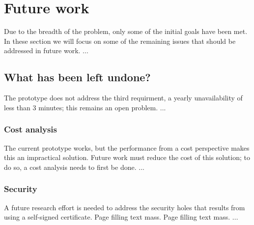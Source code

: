 \section{Future work}
\label{sec:futureWork}










Due to the breadth of the problem, only some of the initial goals have been
met. In these section we will focus on some of the remaining issues that
should be addressed in future work. ...


\subsection{What has been left undone?}
\label{what-has-been-left-undone}


The prototype does not address the third requirment, \ie a yearly unavailability of less than 3 minutes; this remains an open problem. ...


\subsubsection{Cost analysis}




The current prototype works, but the performance from a cost perspective makes this an impractical solution. Future work must reduce the cost of this solution; to do so, a cost analysis needs to first be done. ...


\subsubsection{Security}




A future research effort is needed to address the security holes that results from using a self-signed certificate. Page filling text mass. Page filling text mass. ...


